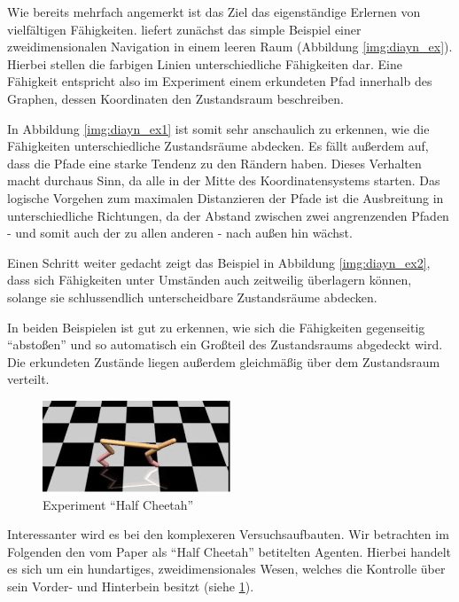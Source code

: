Wie bereits mehrfach angemerkt ist das Ziel das eigenständige Erlernen von vielfältigen Fähigkeiten. \cite{diversity_eysenbach} liefert zunächst das simple Beispiel einer zweidimensionalen Navigation in einem leeren Raum (Abbildung \ref{img:diayn_ex}). Hierbei stellen die farbigen Linien unterschiedliche Fähigkeiten dar. Eine Fähigkeit entspricht also im Experiment einem erkundeten Pfad innerhalb des Graphen, dessen Koordinaten den Zustandsraum beschreiben.

In Abbildung \ref{img:diayn_ex1} ist somit sehr anschaulich zu erkennen, wie die Fähigkeiten unterschiedliche Zustandsräume abdecken. Es fällt außerdem auf, dass die Pfade eine starke Tendenz zu den Rändern haben. Dieses Verhalten macht durchaus Sinn, da alle in der Mitte des Koordinatensystems starten. Das logische Vorgehen zum maximalen Distanzieren der Pfade ist die Ausbreitung in unterschiedliche Richtungen, da der Abstand zwischen zwei angrenzenden Pfaden - und somit auch der zu allen anderen - nach außen hin wächst. 

Einen Schritt weiter gedacht zeigt das Beispiel in Abbildung \ref{img:diayn_ex2}, dass sich Fähigkeiten unter Umständen auch zeitweilig überlagern können, solange sie schlussendlich unterscheidbare Zustandsräume abdecken.

\smallspace

In beiden Beispielen ist gut zu erkennen, wie sich die Fähigkeiten gegenseitig ``abstoßen'' und so automatisch ein Großteil des Zustandsraums abgedeckt wird. Die erkundeten Zustände liegen außerdem gleichmäßig über dem Zustandsraum verteilt.

\smallspace

\begin{figure}[h]
\includegraphics[width=0.5\textwidth, keepaspectratio=true, center]{images/cheetah_image.JPG}
\caption{Experiment ``Half Cheetah''} \label{img:cheetah_ex}
\end{figure}

Interessanter wird es bei den komplexeren Versuchsaufbauten. Wir betrachten im Folgenden den vom Paper \cite{diversity_eysenbach} als ``Half Cheetah'' betitelten Agenten. Hierbei handelt es sich um ein hundartiges, zweidimensionales Wesen, welches die Kontrolle über sein Vorder- und Hinterbein besitzt (siehe \ref{img:cheetah_ex}).

